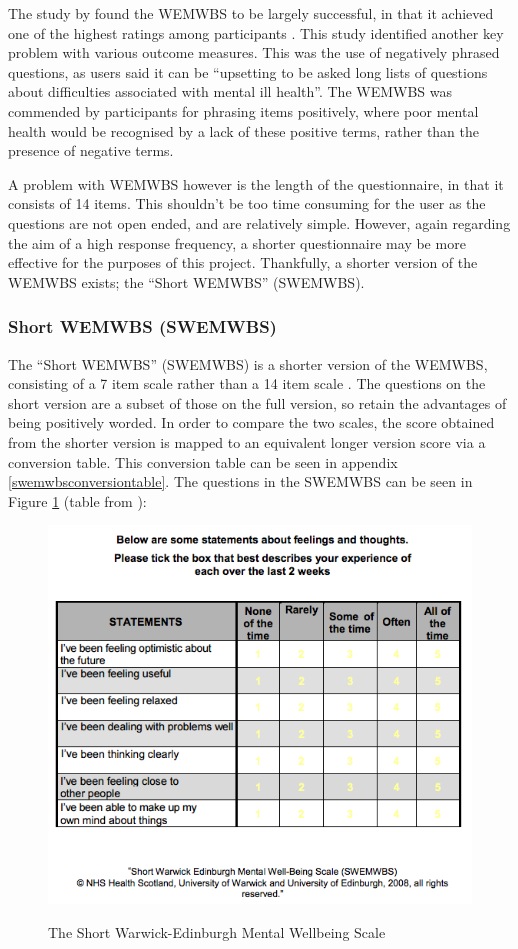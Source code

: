 \documentclass[11pt,openright,a4paper]{report}
\begin{document}
The study by \citeauthor{crawford2011selecting} found the WEMWBS to be largely successful, in that it achieved one of the highest ratings among participants \parencite{crawford2011selecting}. This study identified another key problem with various outcome measures. This was the use of negatively phrased questions, as users said it can be \enquote{upsetting to be asked long lists of questions about difficulties associated with mental ill
health}. The WEMWBS was commended by participants for phrasing items positively, where poor mental health would be recognised by a lack of these positive terms, rather than the presence of negative terms.

A problem with WEMWBS however is the length of the questionnaire, in that it consists of 14 items. This shouldn't be too time consuming for the user as the questions are not open ended, and are relatively simple. However, again regarding the aim of a high response frequency, a shorter questionnaire may be more effective for the purposes of this project. Thankfully, a shorter version of the WEMWBS exists; the \enquote{Short WEMWBS} (SWEMWBS).

\subsubsection{Short WEMWBS (SWEMWBS)}
The \enquote{Short WEMWBS} (SWEMWBS) is a shorter version of the WEMWBS, consisting of a 7 item scale rather than a 14 item scale \parencite{swemwbs}. The questions on the short version are a subset of those on the full version, so retain the advantages of being positively worded. In order to compare the two scales, the score obtained from the shorter version is mapped to an equivalent longer version score via a conversion table. This conversion table can be seen in appendix \ref{swemwbsconversiontable}.
\newpage
The questions in the SWEMWBS can be seen in Figure \ref{fig:swemwbs} (table from \parencite{swemwbsquestions}):
\begin{figure}[ht]
\centering
\caption{The Short Warwick-Edinburgh Mental Wellbeing Scale}
\includegraphics[width=.8\textwidth]{i/swemwbs.png}
\label{fig:swemwbs}
\end{figure}
\end{document}
